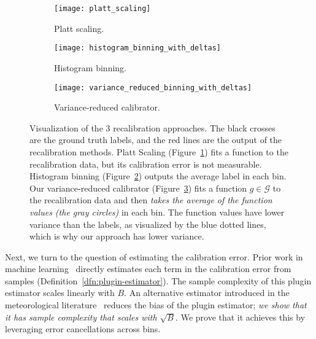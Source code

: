\begin{figure}
     \centering
     \begin{subfigure}[b]{0.32\textwidth}
         \centering
         \texttt{[image: platt\_scaling]}
         \caption{Platt scaling.}
         \label{fig:platt_scaling}
     \end{subfigure}
     \hfill
     \begin{subfigure}[b]{0.32\textwidth}
         \centering
         \texttt{[image: histogram\_binning\_with\_deltas]}
         \caption{Histogram binning.}
         \label{fig:hist_binning}
     \end{subfigure}
     \hfill
     \begin{subfigure}[b]{0.32\textwidth}
         \centering
         \texttt{[image: variance\_reduced\_binning\_with\_deltas]}
         \caption{Variance-reduced calibrator.}
         \label{fig:var_red_binning}
     \end{subfigure}
        \caption{
        Visualization of the 3 recalibration approaches.
        The black crosses are the ground truth labels, and the red lines are the output of the recalibration methods.
        Platt Scaling (Figure~\ref{fig:platt_scaling}) fits a function to the recalibration data, but its calibration error is not measurable.
        Histogram binning (Figure~\ref{fig:hist_binning}) outputs the average label in each bin.
        Our variance-reduced calibrator (Figure~\ref{fig:var_red_binning}) fits a function $g \in \mathcal{G}$ to the recalibration data and then \emph{takes the average of the function values (the gray circles)} in each bin.
        The function values have lower variance than the labels, as visualized by the blue dotted lines, which is why our approach has lower variance. 
        }
        \label{fig:variance_reduced_illustration}
\end{figure}

Next, we turn to the question of estimating the calibration error. Prior work in machine learning~\cite{nguyen2015posterior, guo2017calibration, hendrycks2019anomaly, kuleshov2015calibrated, hendrycks2019pretraining} directly estimates each term in the calibration error from samples (Definition~\ref{dfn:plugin-estimator}). The sample complexity of this plugin estimator scales linearly with $B$. An alternative estimator introduced in the meteorological literature~\cite{brocker2012empirical, ferro2012bias} reduces the bias of the plugin estimator; \emph{we show that it has sample complexity that scales with $\sqrt{B}$}. We prove that it achieves this by leveraging error cancellations across bins.

